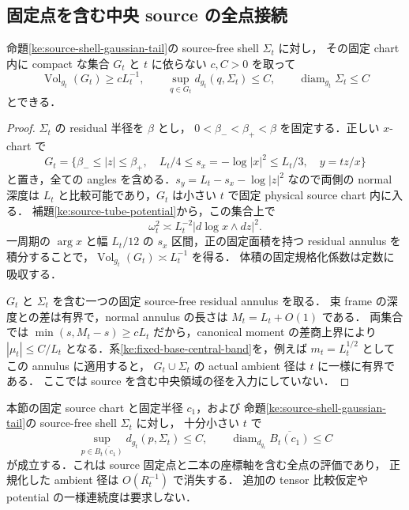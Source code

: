 \subsection{固定点を含む中央 source の全点接続}

\begin{lemma}
\label{ke:source-central-volume-anchor}
命題\ref{ke:source-shell-gaussian-tail}の source-free shell $\Sigma_t$ に対し，
その固定 chart 内に compact な集合 $G_t$ と $t$ に依らない $c,C>0$ を取って
\[
 \operatorname{Vol}_{g_t}(G_t)\ge cL_t^{-1},\qquad
 \sup_{q\in G_t}d_{g_t}(q,\Sigma_t)\le C,
 \qquad \operatorname{diam}_{g_t}\Sigma_t\le C
\]
とできる．
\end{lemma}

\begin{proof}
$\Sigma_t$ の residual 半径を $\beta$ とし，
$0<\beta_-<\beta_+<\beta$ を固定する．正しい $x$-chart で
\[
 G_t=\{\beta_-\le|z|\le\beta_+,\quad
                  L_t/4\le s_x=-\log|x|^2\le L_t/3,\quad y=tz/x\}
\]
と置き，全ての angles を含める．$s_y=L_t-s_x-\log|z|^2$ なので両側の normal 深度は
$L_t$ と比較可能であり，$G_t$ は小さい $t$ で固定 physical source chart 内に入る．
補題\ref{ke:source-tube-potential}から，この集合上で
\[
 \omega_t^2\asymp L_t^{-2}|d\log x\wedge dz|^2.
\]
一周期の $\arg x$ と幅 $L_t/12$ の $s_x$ 区間，正の固定面積を持つ residual annulus を
積分することで，$\operatorname{Vol}_{g_t}(G_t)\asymp L_t^{-1}$ を得る．
体積の固定規格化係数は定数に吸収する．

$G_t$ と $\Sigma_t$ を含む一つの固定 source-free residual annulus を取る．
束 frame の深度との差は有界で，normal annulus の長さは $M_t=L_t+O(1)$ である．
両集合では $\min(s,M_t-s)\ge cL_t$ だから，canonical moment の差商上界により
$|\mu_t|\le C/L_t$ となる．系\ref{ke:fixed-base-central-band}を，例えば
$m_t=L_t^{1/2}$ としてこの annulus に適用すると，
$G_t\cup\Sigma_t$ の actual ambient 径は $t$ に一様に有界である．
ここでは source を含む中央領域の径を入力にしていない．
\end{proof}

\begin{theorem}
\label{ke:source-central-diameter}
本節の固定 source chart と固定半径 $c_1$，および
命題\ref{ke:source-shell-gaussian-tail}の source-free shell $\Sigma_t$ に対し，
十分小さい $t$ で
\begin{equation}\label{ke:eq:source-central-diameter}
 \sup_{p\in\overline{B_t(c_1)}}d_{g_t}(p,\Sigma_t)
 \le C,\qquad
 \operatorname{diam}_{d_{g_t}}\overline{B_t(c_1)}
 \le C
\end{equation}
が成立する．これは source 固定点と二本の座標軸を含む全点の評価であり，
正規化した ambient 径は $O(R_t^{-1})$ で消失する．
追加の tensor 比較仮定や potential の一様連続度は要求しない．
\end{theorem}

